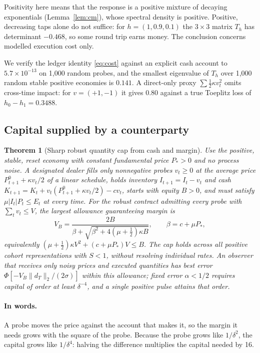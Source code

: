 \documentclass[12pt]{article}
\newtheorem{theorem}{Theorem}[section]
\theoremstyle{definition}
\theoremstyle{remark}
\begin{document}
Positivity here means that the response is a positive mixture of decaying exponentials (Lemma~\ref{lem:cm}), whose spectral density is positive. Positive, decreasing taps alone do not suffice: for $h=(1,0.9,0.1)$ the $3\times3$ matrix $T_h$ has determinant $-0.468$, so some round trip earns money. The conclusion concerns modelled execution cost only.

We verify the ledger identity \eqref{eq:cost} against an explicit cash account to $5.7\times10^{-13}$ on 1,000 random probes, and the smallest eigenvalue of $T_h$ over 1,000 random stable positive economies is $0.141$. A direct-only proxy $\sum\tfrac12\kappa v_t^2$ omits cross-time impact: for $v=(+1,-1)$ it gives $0.80$ against a true Toeplitz loss of $h_0-h_1=0.3488$.

\subsection{Capital supplied by a counterparty}

\begin{theorem}[Sharp robust quantity cap from cash and margin]\label{thm:cap}
Use the positive, stable, reset economy with constant fundamental price $P_*>0$ and no process noise. A designated dealer fills only nonnegative probes $v_t\ge0$ at the average price $P^0_{t+1}+\kappa v_t/2$ of a linear schedule, holds inventory $I_{t+1}=I_t-v_t$ and cash $K_{t+1}=K_t+v_t(P^0_{t+1}+\kappa v_t/2)-cv_t$, starts with equity $B>0$, and must satisfy $\mu|I_t|P_t\le E_t$ at every time. For the robust contract admitting every probe with $\sum_tv_t\le V$, the largest allowance guaranteeing margin is
\begin{equation}\label{eq:VB}
V_B=\frac{2B}{\beta+\sqrt{\beta^2+4(\mu+\tfrac12)\kappa B}},\qquad\beta=c+\mu P_*,
\end{equation}
equivalently $(\mu+\tfrac12)\kappa V^2+(c+\mu P_*)V\le B$. The cap holds across all positive cohort representations with $S<1$, without resolving individual rates. An observer that receives only noisy prices and executed quantities has best error $\Phi[-V_B\|d_T\|_2/(2\sigma)]$ within this allowance; fixed error $\alpha<1/2$ requires capital of order at least $\delta^{-4}$, and a single positive pulse attains that order.
\end{theorem}

\paragraph{In words.} A probe moves the price against the account that makes it, so the margin it needs grows with the square of the probe. Because the probe grows like $1/\delta^2$, the capital grows like $1/\delta^4$: halving the difference multiplies the capital needed by 16.
\end{document}
